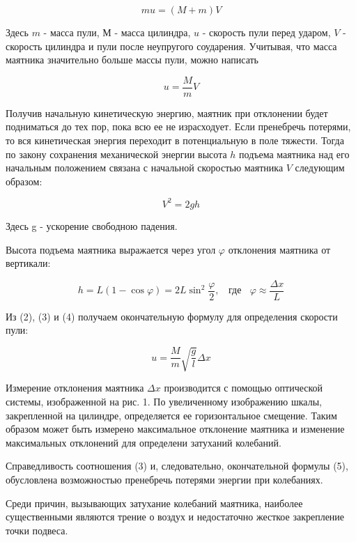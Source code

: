 \documentclass[14pt]{article}
\begin{document}
\begin{equation}
mu = (M + m)V
\end{equation}

Здесь $m$ - масса пули, $М$ - масса цилиндра, $u$ - скорость пули перед ударом, $V$ - скорость цилиндра и пули после неупругого соударения. Учитывая, что масса маятника значительно больше массы пули, можно написать 

\begin{equation}
u = \frac{M}{m}V
\end{equation}

Получив начальную кинетическую энергию, маятник при отклонении будет подниматься до тех пор, пока всю ее не израсходует. Если пренебречь потерями, то вся кинетическая энергия переходит в потенциальную в поле тяжести. Тогда по закону сохранения механической энергии высота $h$ подъема маятника над его начальным положением связана с начальной скоростью маятника $V$ следующим образом:

\begin{equation}
V^2 = 2gh
\end{equation}

Здесь g - ускорение свободною падения.


Высота подъема маятника выражается через угол $\varphi$ отклонения маятника от вертикали:

\begin{equation}
h = L(1 - \cos\varphi) = 2L\sin^2\frac{\varphi}{2},~~~~\text{где}~~~~\varphi \approx \frac{\Delta x}{L}
\end{equation}

Из (2), (3) и (4) получаем окончательную формулу для определения скорости пули:

\begin{equation}
u = \frac{M}{m}\sqrt{\frac{g}{l}}\Delta x
\end{equation}

Измерение отклонения маятника $\Delta x$ производится с помощью оптической системы, изображенной на рис. 1. По увеличенному изображению шкалы, закрепленной на цилиндре, определяется ее горизонтальное смещение. Таким образом может быть измерено максимальное отклонение маятника и изменение максимальных отклонений для определени затуханий колебаний.

Справедливость соотношения (3) и, следовательно, окончательной формулы (5), обусловлена возможностью пренебречь потерями энергии при колебаниях.

Среди причин, вызывающих затухание колебаний маятника, наиболее существенными являются трение о воздух и недостаточно жесткое закрепление точки подвеса.
\end{document}
